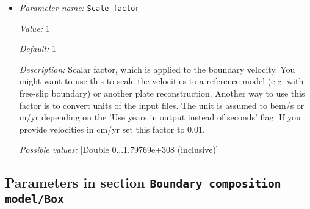 \begin{itemize}
{\it Value:} 0


{\it Default:} 0


{\it Description:} Number of the first velocity file to be loaded when the model time is larger than 'First velocity file model time'.


{\it Possible values:} [Integer range -2147483648...2147483647 (inclusive)]
\item {\it Parameter name:} {\tt Scale factor}
\label{parameters:Boundary composition model/Ascii data model/Scale factor}


{\it Value:} 1


{\it Default:} 1


{\it Description:} Scalar factor, which is applied to the boundary velocity. You might want to use this to scale the velocities to a reference model (e.g. with free-slip boundary) or another plate reconstruction. Another way to use this factor is to convert units of the input files. The unit is assumed to bem/s or m/yr depending on the 'Use years in output instead of seconds' flag. If you provide velocities in cm/yr set this factor to 0.01.


{\it Possible values:} [Double 0...1.79769e+308 (inclusive)]
\end{itemize}

\subsection{Parameters in section \tt Boundary composition model/Box}
\label{parameters:Boundary_20composition_20model/Box}

